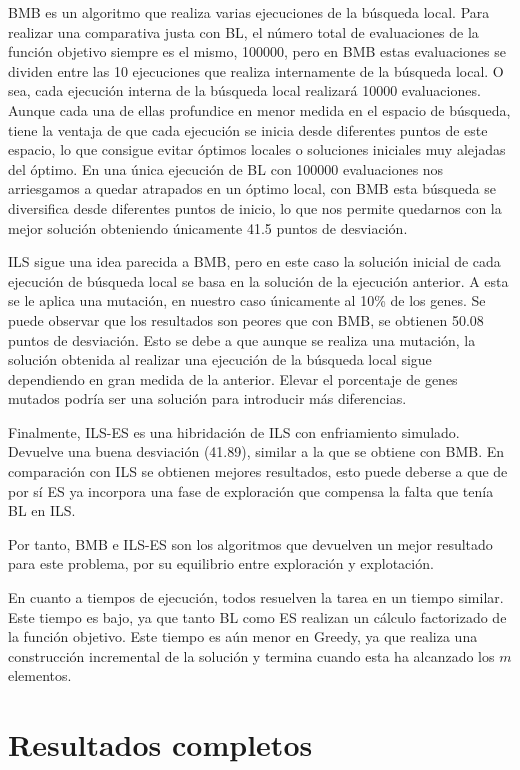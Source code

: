 BMB es un algoritmo que realiza varias ejecuciones de la búsqueda local. Para realizar una comparativa justa con BL, el número total de evaluaciones de la función objetivo siempre es el mismo, 100000, pero en BMB estas evaluaciones se dividen entre las 10 ejecuciones que realiza internamente de la búsqueda local. O sea, cada ejecución interna de la búsqueda local realizará 10000 evaluaciones. Aunque cada una de ellas profundice en menor medida en el espacio de búsqueda, tiene la ventaja de que cada ejecución se inicia desde diferentes puntos de este espacio, lo que consigue evitar óptimos locales o soluciones iniciales muy alejadas del óptimo. En una única ejecución de BL con 100000 evaluaciones nos arriesgamos a quedar atrapados en un óptimo local, con BMB esta búsqueda se diversifica desde diferentes puntos de inicio, lo que nos permite quedarnos con la mejor solución obteniendo únicamente 41.5 puntos de desviación.

ILS sigue una idea parecida a BMB, pero en este caso la solución inicial de cada ejecución de búsqueda local se basa en la solución de la ejecución anterior. A esta se le aplica una mutación, en nuestro caso únicamente al 10\% de los genes. Se puede observar que los resultados son peores que con BMB, se obtienen 50.08 puntos de desviación. Esto se debe a que aunque se realiza una mutación, la solución obtenida al realizar una ejecución de la búsqueda local sigue dependiendo en gran medida de la anterior. Elevar el porcentaje de genes mutados podría ser una solución para introducir más diferencias.

Finalmente, ILS-ES es una hibridación de ILS con enfriamiento simulado. Devuelve una buena desviación (41.89), similar a la que se obtiene con BMB. En comparación con ILS se obtienen mejores resultados, esto puede deberse a que de por sí ES ya incorpora una fase de exploración que compensa la falta que tenía BL en ILS.

Por tanto, BMB e ILS-ES son los algoritmos que devuelven un mejor resultado para este problema, por su equilibrio entre exploración y explotación.

En cuanto a tiempos de ejecución, todos resuelven la tarea en un tiempo similar. Este tiempo es bajo, ya que tanto BL como ES realizan un cálculo factorizado de la función objetivo. Este tiempo es aún menor en Greedy, ya que realiza una construcción incremental de la solución y termina cuando esta ha alcanzado los $m$ elementos.

\section{Resultados completos}
